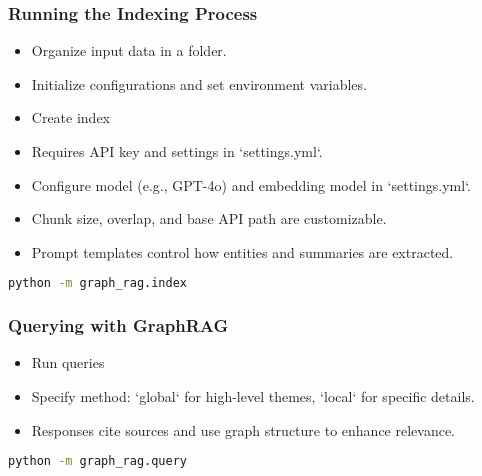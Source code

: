 \begin{frame}[fragile]\frametitle{Running the Indexing Process}
  \begin{itemize}
    \item Organize input data in a folder.
    \item Initialize configurations and set environment variables.
    \item Create index
    \item Requires API key and settings in `settings.yml`.
    \item Configure model (e.g., GPT-4o) and embedding model in `settings.yml`.
    \item Chunk size, overlap, and base API path are customizable.
    \item Prompt templates control how entities and summaries are extracted.	
  \end{itemize}

    \begin{lstlisting}[language=bash]
python -m graph_rag.index
    \end{lstlisting}  
\end{frame}

\begin{frame}[fragile]\frametitle{Querying with GraphRAG}
  \begin{itemize}
    \item Run queries
    \item Specify method: `global` for high-level themes, `local` for specific details.
    \item Responses cite sources and use graph structure to enhance relevance.
  \end{itemize}
    \begin{lstlisting}[language=bash]
python -m graph_rag.query
    \end{lstlisting}  
\end{frame}




